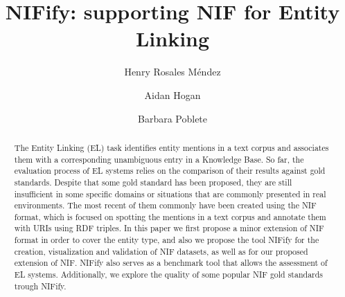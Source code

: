 \documentclass[sigconf]{acmart}
\begin{document}
%
\title{NIFify: supporting NIF for Entity Linking}

%
\author{Henry Rosales M\'endez}

\author{Aidan Hogan}


\author{Barbara Poblete}


%
\renewcommand{\shortauthors}{Rosales et al.}

%
\begin{abstract}
The Entity Linking (EL) task identifies entity mentions in a text corpus and associates them with a corresponding unambiguous entry in a Knowledge Base. So far, the evaluation process of EL systems relies on the comparison of their results against gold standards. Despite that some gold standard has been proposed, they are still insufficient in some specific domains or situations that are commonly presented in real environments. 
The most recent of them commonly have been created using the NIF format, which is focused on spotting the mentions in a text corpus and annotate them with URIs using RDF triples. In this paper we first propose a minor extension of NIF format in order to cover the entity type, and also we propose the tool NIFify for the creation, visualization and validation of NIF datasets, as well as for our proposed extension of NIF. NIFify also serves as a benchmark tool that allows the assessment of EL systems. Additionally, we explore the quality of some popular NIF gold standards trough NIFify. 
\end{abstract}
\end{document}
